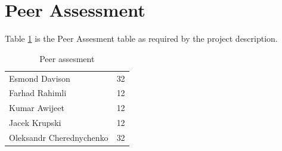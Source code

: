 \section{Peer Assessment}
Table \ref{table:peerAssesment} is the Peer Assesment table as required by the project description.

\begin{table}[hb]
\centering
\caption{Peer assesment}
\label{table:peerAssesment}
\begin{tabular}{lc}
\hline
Esmond Davison & 32\\
Farhad Rahimli & 12\\
Kumar Awijeet &  12\\
Jacek Krupski &  12\\
Oleksandr Cherednychenko &  32\\
\hline
\end{tabular}
\end{table}

\setlength{\parskip}{0em}
